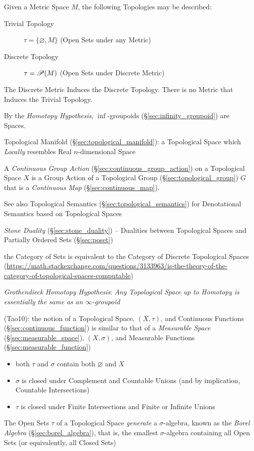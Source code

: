 Given a Metric Space $M$, the following Topologies may be described:
\begin{description}
\item[Trivial Topology] $\tau = \{\varnothing, M\}$ (Open Sets under
  any Metric)

\item[Discrete Topology] $\tau = \mathscr{P}(M)$ (Open Sets under
  Discrete Metric)
\end{description}
The Discrete Metric Induces the Discrete Topology. There is no Metric
that Induces the Trivial Topology.

By the \emph{Homotopy Hypothesis}, $\inf$-groupoids
(\S\ref{sec:infinity_groupoid}) are Spaces.

\fist Topological Manifold (\S\ref{sec:topological_manifold}): a Topological
Space which \emph{Locally} resembles Real $n$-dimensional Space

A \emph{Continuous Group Action} (\S\ref{sec:continuous_group_action}) on a
Topological Space $X$ is a Group Action of a Topological Group
(\S\ref{sec:topological_group}) $G$ that is a \emph{Continuous Map}
(\S\ref{sec:continuous_map}).

\fist See also Topological Semantics
(\S\ref{sec:topological_semantics}) for Denotational Semantics based
on Topological Spaces

\emph{Stone Duality} (\S\ref{sec:stone_duality}) -- Dualities between
Topological Spaces and Partially Ordered Sets (\S\ref{sec:poset})

the Category of Sets is equivalent to the Category of Discrete Topological
Spaces
(\url{https://math.stackexchange.com/questions/3133963/is-the-theory-of-the-category-of-topological-spaces-computable})

\emph{Grothendieck Homotopy Hypothesis}:
\emph{
  Any Topological Space up to Homotopy is essentially the same as an
  $\infty$-groupoid
}

(Tao10):
the notion of a Topological Space, $(X,\tau)$, and Continuous Functions
(\S\ref{sec:continuous_function}) is similar to that of a \emph{Measurable
  Space} (\S\ref{sec:measurable_space}), $(X,\sigma)$, and Measurable Functions
(\S\ref{sec:measurable_function})
\begin{itemize}
  \item both $\tau$ and $\sigma$ contain both $\varnothing$ and $X$
  \item $\sigma$ is closed under Complement and Countable Unions (and
    by implication, Countable Intersections)
  \item $\tau$ is closed under Finite Intersections and Finite or Infinite
    Unions
\end{itemize}
The Open Sets $\tau$ of a Topological Space \emph{generate} a $\sigma$-algebra,
known as the \emph{Borel Algebra} (\S\ref{sec:borel_algebra}), that is, the
smallest $\sigma$-algebra containing all Open Sets (or equivalently, all Closed
Sets)

